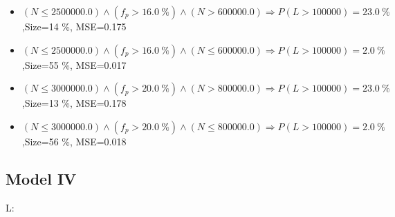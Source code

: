 \documentclass[numbered]{CSL}
\begin{document}
\begin{itemize}
\item $(N \leq 2500000.0) \land (f_p > 16.0~\%) \land (N > 600000.0) \Rightarrow P(L > 100 000) = 23.0~\%$,\hfill Size=14 \%, MSE=0.175
\item $(N \leq 2500000.0) \land (f_p > 16.0~\%) \land (N \leq 600000.0) \Rightarrow P(L > 100 000) = 2.0~\%$,\hfill Size=55 \%, MSE=0.017
\item $(N \leq 3000000.0) \land (f_p > 20.0~\%) \land (N > 800000.0) \Rightarrow P(L > 100 000) = 23.0~\%$,\hfill Size=13 \%, MSE=0.178
\item $(N \leq 3000000.0) \land (f_p > 20.0~\%) \land (N \leq 800000.0) \Rightarrow P(L > 100 000) = 2.0~\%$,\hfill Size=56 \%, MSE=0.018
\end{itemize}

\subsection{Model IV}
L:
\end{document}
